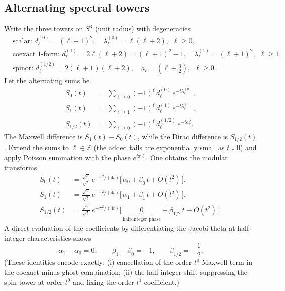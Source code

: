 \documentclass[11pt]{article}
\theoremstyle{definition}
\theoremstyle{remark}
\begin{document}
\subsection{Alternating spectral towers}
Write the three towers on $S^3$ (unit radius) with degeneracies
\begin{align*}
&\text{scalar: } d^{(0)}_\ell=(\ell+1)^2,\quad \lambda^{(0)}_\ell=\ell(\ell+2),\ \ \ell\ge0,\\
&\text{coexact 1-form: } d^{(1)}_\ell=2\ell(\ell+2)=(\ell+1)^2-1,\quad \lambda^{(1)}_\ell=(\ell+1)^2,\ \ \ell\ge1,\\
&\text{spinor: } d^{(1/2)}_\ell=2(\ell+1)(\ell+2),\quad a_\ell=(\ell+\tfrac{3}{2}),\ \ \ell\ge0.
\end{align*}
Let the alternating sums be
\begin{align*}
S_0(t)&=\sum_{\ell\ge0}(-1)^\ell\,d^{(0)}_\ell\,e^{-t\lambda^{(0)}_\ell},\\
S_1(t)&=\sum_{\ell\ge1}(-1)^\ell\,d^{(1)}_\ell\,e^{-t\lambda^{(1)}_\ell},\\
S_{1/2}(t)&=\sum_{\ell\ge0}(-1)^\ell\,d^{(1/2)}_\ell\,e^{-t a_\ell^2}.
\end{align*}
The Maxwell difference is $S_1(t)-S_0(t)$, while the Dirac difference is $S_{1/2}(t)$. Extend the sums to $\ell\in\mathbb{Z}$ (the added tails are exponentially small as $t\downarrow 0$) and apply Poisson summation with the phase $e^{i\pi \ell}$. One obtains the modular transforms
\begin{align*}
S_0(t)&=\frac{\sqrt{\pi}}{\sqrt{t}}\,e^{-\pi^2/(4t)}\Big[\,\alpha_0 + \beta_0\,t + O(t^2)\,\Big],\\
S_1(t)&=\frac{\sqrt{\pi}}{\sqrt{t}}\,e^{-\pi^2/(4t)}\Big[\,\alpha_1 + \beta_1\,t + O(t^2)\,\Big],\\
S_{1/2}(t)&=\frac{\sqrt{\pi}}{\sqrt{t}}\,e^{-\pi^2/(4t)}\Big[\,\underbrace{0}_{\text{half-integer phase}} + \beta_{1/2}\,t + O(t^2)\,\Big].
\end{align*}
A direct evaluation of the coefficients by differentiating the Jacobi theta at half-integer characteristics shows
\begin{equation}\label{eq:CmaxCdir-values}
\alpha_1-\alpha_0=0,\qquad \beta_1-\beta_0=-1,\qquad \beta_{1/2}=-\frac{1}{2}.
\end{equation}
(These identities encode exactly: (i) cancellation of the order-$t^0$ Maxwell term in the coexact-minus-ghost combination; (ii) the half-integer shift suppressing the spin tower at order $t^0$ and fixing the order-$t^1$ coefficient.)
\end{document}
